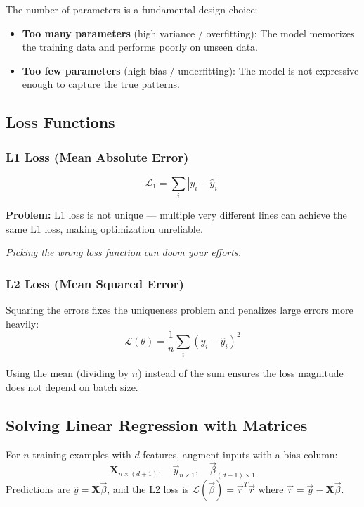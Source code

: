 \documentclass[11pt]{article}
\begin{document}
The number of parameters is a fundamental design choice:
\begin{itemize}
  \item \textbf{Too many parameters} (high variance / overfitting): The model memorizes the training data and performs poorly on unseen data.
  \item \textbf{Too few parameters} (high bias / underfitting): The model is not expressive enough to capture the true patterns.
\end{itemize}

\subsection{Loss Functions}

\subsubsection{L1 Loss (Mean Absolute Error)}

\[
\mathcal{L}_1 = \sum_i |y_i - \hat{y}_i|
\]

\textbf{Problem:} L1 loss is not unique --- multiple very different lines can achieve the same L1 loss, making optimization unreliable.

\begin{takeawaybox}
\textit{Picking the wrong loss function can doom your efforts.}
\end{takeawaybox}

\subsubsection{L2 Loss (Mean Squared Error)}

Squaring the errors fixes the uniqueness problem and penalizes large errors more heavily:
\[
\mathcal{L}(\theta) = \frac{1}{n}\sum_i (y_i - \hat{y}_i)^2
\]

Using the mean (dividing by $n$) instead of the sum ensures the loss magnitude does not depend on batch size.

\subsection{Solving Linear Regression with Matrices}

For $n$ training examples with $d$ features, augment inputs with a bias column:
\[
\boldsymbol{X}_{n\times(d+1)},\quad \vec{y}_{n\times1},\quad \vec{\beta}_{(d+1)\times1}
\]
Predictions are $\hat{y} = \boldsymbol{X}\vec{\beta}$, and the L2 loss is $\mathcal{L}(\vec{\beta}) = \vec{r}^T\vec{r}$ where $\vec{r} = \vec{y} - \boldsymbol{X}\vec{\beta}$.
\end{document}
